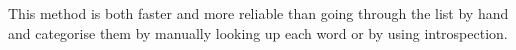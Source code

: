 \documentclass{report}
\begin{document}
This method is
both faster and more reliable than going through the list by hand and categorise them
by manually looking up each word or by using introspection.



%
%
%
%
%
\end{document}
